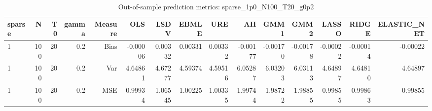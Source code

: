 \begin{table}[!htbp]\centering
\caption{Out-of-sample prediction metrics: sparse_1p0_N100_T20_g0p2}
\label{tab:table3_sparse_1p0_N100_T20_g0p2}
\begin{tabular}{lrrrrrrrrrrrrrr}
\hline
sparse & N & T0 & gamma & Measure & OLS & LSDV & EBMLE & URE & AH & GMM1 & GMM2 & LASSO & RIDGE & ELASTIC_NET \\
\hline
1 & 100 & 20 & 0.2 & Bias & -0.00006 & 0.00332 & 0.00331 & 0.00332 & -0.00177 & -0.00170 & -0.00178 & -0.00022 & -0.00014 & -0.00022 \\
1 & 100 & 20 & 0.2 & Var & 4.64861 & 4.67277 & 4.59374 & 4.59516 & 6.05287 & 6.03203 & 6.03113 & 4.64897 & 4.64810 & 4.64897 \\
1 & 100 & 20 & 0.2 & MSE & 0.99934 & 1.06545 & 1.00225 & 1.00335 & 1.99744 & 1.98722 & 1.98855 & 0.99855 & 0.99863 & 0.99855 \\
\hline
\end{tabular}
\end{table}

